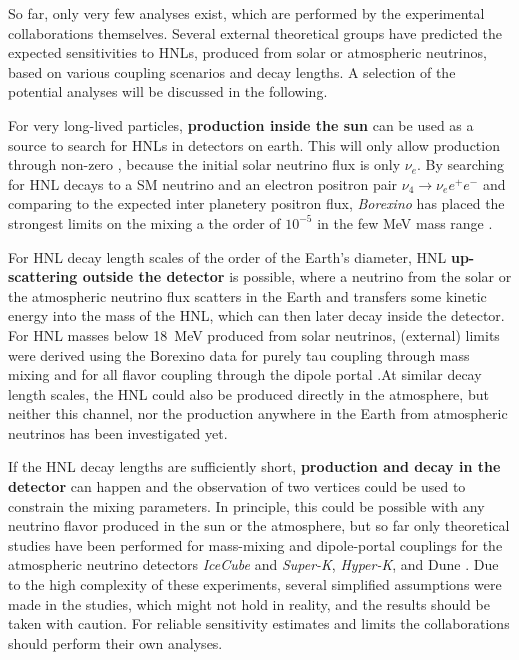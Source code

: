 So far, only very few analyses exist, which are performed by the experimental collaborations themselves. Several external theoretical groups have predicted the expected sensitivities to HNLs, produced from solar or atmospheric neutrinos, based on various coupling scenarios and decay lengths. A selection of the potential analyses will be discussed in the following.

For very long-lived particles, \textbf{production inside the sun} can be used as a source to search for HNLs in detectors on earth. This will only allow production through non-zero , because the initial solar neutrino flux is only $\nu_e$. By searching for HNL decays to a SM neutrino and an electron positron pair $\nu_4 \rightarrow \nu_e e^+ e^-$ and comparing to the expected inter planetery positron flux, \textit{Borexino} has placed the strongest limits on the mixing  a the order of $10^{-5}$ in the few \si{\mega\electronvolt} mass range .

For HNL decay length scales of the order of the Earth's diameter, HNL \textbf{up-scattering outside the detector} is possible, where a neutrino from the solar or the atmospheric neutrino flux scatters in the Earth and transfers some kinetic energy into the mass of the HNL, which can then later decay inside the detector. For HNL masses below \SI{18}{\mega\electronvolt} produced from solar neutrinos, (external) limits were derived using the Borexino data for purely tau coupling through mass mixing  and for all flavor coupling through the dipole portal .At similar decay length scales, the HNL could also be produced directly in the atmosphere, but neither this channel, nor the production anywhere in the Earth from atmospheric neutrinos has been investigated yet.

If the HNL decay lengths are sufficiently short, \textbf{production and decay in the detector} can happen and the observation of two vertices could be used to constrain the mixing parameters. In principle, this could be possible with any neutrino flavor produced in the sun or the atmosphere, but so far only theoretical studies have been performed for mass-mixing and dipole-portal couplings for the atmospheric neutrino detectors \textit{IceCube}  and \textit{Super-K}, \textit{Hyper-K}, and Dune . Due to the high complexity of these experiments, several simplified assumptions were made in the studies, which might not hold in reality, and the results should be taken with caution. For reliable sensitivity estimates and limits the collaborations should perform their own analyses.


